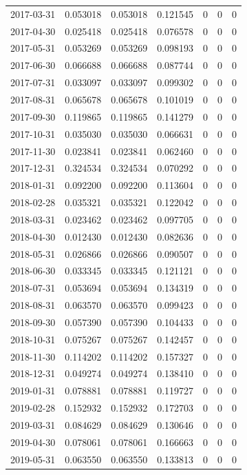 \documentclass[conference,onecolumn]{IEEEtran}
\begin{document}
\begin{longtable}{|c|c|c|c|c|c|c|}
2017-03-31 & 0.053018 & 0.053018 & 0.121545 & 0 & 0 & 0 \\
2017-04-30 & 0.025418 & 0.025418 & 0.076578 & 0 & 0 & 0 \\
2017-05-31 & 0.053269 & 0.053269 & 0.098193 & 0 & 0 & 0 \\
2017-06-30 & 0.066688 & 0.066688 & 0.087744 & 0 & 0 & 0 \\
2017-07-31 & 0.033097 & 0.033097 & 0.099302 & 0 & 0 & 0 \\
2017-08-31 & 0.065678 & 0.065678 & 0.101019 & 0 & 0 & 0 \\
2017-09-30 & 0.119865 & 0.119865 & 0.141279 & 0 & 0 & 0 \\
2017-10-31 & 0.035030 & 0.035030 & 0.066631 & 0 & 0 & 0 \\
2017-11-30 & 0.023841 & 0.023841 & 0.062460 & 0 & 0 & 0 \\
2017-12-31 & 0.324534 & 0.324534 & 0.070292 & 0 & 0 & 0 \\
2018-01-31 & 0.092200 & 0.092200 & 0.113604 & 0 & 0 & 0 \\
2018-02-28 & 0.035321 & 0.035321 & 0.122042 & 0 & 0 & 0 \\
2018-03-31 & 0.023462 & 0.023462 & 0.097705 & 0 & 0 & 0 \\
2018-04-30 & 0.012430 & 0.012430 & 0.082636 & 0 & 0 & 0 \\
2018-05-31 & 0.026866 & 0.026866 & 0.090507 & 0 & 0 & 0 \\
2018-06-30 & 0.033345 & 0.033345 & 0.121121 & 0 & 0 & 0 \\
2018-07-31 & 0.053694 & 0.053694 & 0.134319 & 0 & 0 & 0 \\
2018-08-31 & 0.063570 & 0.063570 & 0.099423 & 0 & 0 & 0 \\
2018-09-30 & 0.057390 & 0.057390 & 0.104433 & 0 & 0 & 0 \\
2018-10-31 & 0.075267 & 0.075267 & 0.142457 & 0 & 0 & 0 \\
2018-11-30 & 0.114202 & 0.114202 & 0.157327 & 0 & 0 & 0 \\
2018-12-31 & 0.049274 & 0.049274 & 0.138410 & 0 & 0 & 0 \\
2019-01-31 & 0.078881 & 0.078881 & 0.119727 & 0 & 0 & 0 \\
2019-02-28 & 0.152932 & 0.152932 & 0.172703 & 0 & 0 & 0 \\
2019-03-31 & 0.084629 & 0.084629 & 0.130646 & 0 & 0 & 0 \\
2019-04-30 & 0.078061 & 0.078061 & 0.166663 & 0 & 0 & 0 \\
2019-05-31 & 0.063550 & 0.063550 & 0.133813 & 0 & 0 & 0 \\

\end{longtable}
\end{document}
